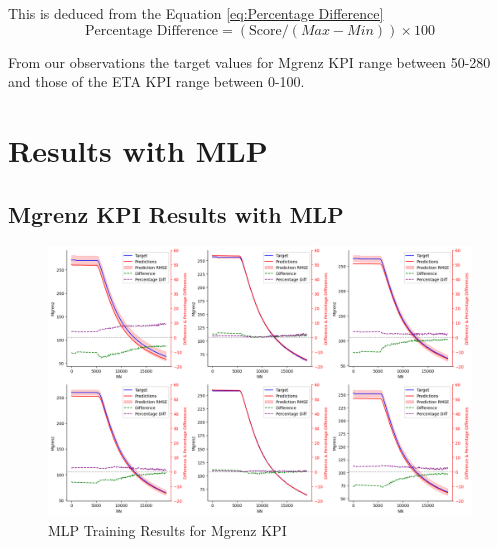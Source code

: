 \documentclass{report} %
\begin{document}
This is deduced from the Equation \ref{eq:Percentage Difference}
\begin{equation}
    \text{Percentage Difference} = (\text{Score} / {(Max - Min)})  \times 100
    \label{eq:Percentage Difference}
\end{equation}

From our observations the target values for Mgrenz \ac{KPI} range between 50-280 and those of the ETA \ac{KPI} range between 0-100.

\section{Results with \ac{MLP}}\label{sec:Results with MLP}

\subsection{Mgrenz \ac{KPI} Results with \ac{MLP}}\label{sec:2D Torque Curve Results with MLP}

\begin{figure}[H]
    \centering
    \includegraphics[width=1\textwidth]{./ReportImages/KPI2D_predictions.png} 
    \caption{MLP Training Results for Mgrenz \ac{KPI}} 
    \label{fig:MLP Training Results for 2D KPI(Mgrenz)}
\end{figure}
\end{document}
